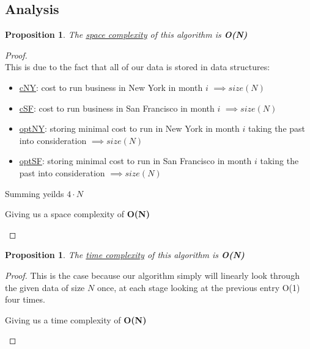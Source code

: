 \documentclass[12pt]{article}
\newtheorem{proposition}[theorem]{Proposition}
\begin{document}
\subsection{Analysis}
\begin{proposition}
\label{numq}
The \underline{space complexity} of this algorithm is \textbf{O(N)}
\end{proposition}

\begin{proof}
~ \\ \indent This is due to the fact that all of our data is stored in data structures:
\begin{itemize}
    \item \underline{cNY}: cost to run business in New York in month $i$ $\implies size(N)$
    \item \underline{cSF}: cost to run business in San Francisco in month $i$ $\implies size(N)$
    \item \underline{optNY}: storing minimal cost to run in New York in month $i$ taking the past into
    consideration $\implies size(N)$
    \item \underline{optSF}: storing minimal cost to run in San Francisco in month $i$  taking the past
    into consideration $\implies size(N)$
\end{itemize}
Summing yeilds $4\cdot N$
\begin{center}
    Giving us a space complexity of \textbf{O(N)}
\end{center}
\end{proof}

\newpage
\begin{proposition}
\label{numq}
The \underline{time complexity} of this algorithm is \textbf{O(N)}
\end{proposition}

\begin{proof}
This is the case because our algorithm simply will linearly look through the given data of size $N$
once, at each stage looking at the previous entry O(1) four times.
\begin{center}
    Giving us a time complexity of \textbf{O(N)}
\end{center}
\end{proof}

\end{document}
